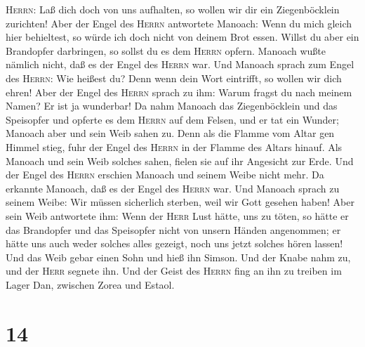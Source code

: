 \textsc{Herrn}: Laß dich doch von uns aufhalten, so wollen wir dir ein
Ziegenböcklein zurichten!  Aber der Engel des
\textsc{Herrn} antwortete Manoach: Wenn du mich gleich hier behieltest,
so würde ich doch nicht von deinem Brot essen. Willst du aber ein
Brandopfer darbringen, so sollst du es dem \textsc{Herrn} opfern.
Manoach wußte nämlich nicht, daß es der Engel des \textsc{Herrn} war.
 Und Manoach sprach zum Engel des \textsc{Herrn}: Wie
heißest du? Denn wenn dein Wort eintrifft, so wollen wir dich ehren!
 Aber der Engel des \textsc{Herrn} sprach zu ihm: Warum
fragst du nach meinem Namen? Er ist ja wunderbar!  Da
nahm Manoach das Ziegenböcklein und das Speisopfer und opferte es dem
\textsc{Herrn} auf dem Felsen, und er tat ein Wunder; Manoach aber und
sein Weib sahen zu.  Denn als die Flamme vom Altar gen
Himmel stieg, fuhr der Engel des \textsc{Herrn} in der Flamme des Altars
hinauf. Als Manoach und sein Weib solches sahen, fielen sie auf ihr
Angesicht zur Erde.  Und der Engel des \textsc{Herrn}
erschien Manoach und seinem Weibe nicht mehr. Da erkannte Manoach, daß
es der Engel des \textsc{Herrn} war.  Und Manoach sprach
zu seinem Weibe: Wir müssen sicherlich sterben, weil wir Gott gesehen
haben!  Aber sein Weib antwortete ihm: Wenn der
\textsc{Herr} Lust hätte, uns zu töten, so hätte er das Brandopfer und
das Speisopfer nicht von unsern Händen angenommen; er hätte uns auch
weder solches alles gezeigt, noch uns jetzt solches hören lassen!
 Und das Weib gebar einen Sohn und hieß ihn Simson. Und
der Knabe nahm zu, und der \textsc{Herr} segnete ihn. 
Und der Geist des \textsc{Herrn} fing an ihn zu treiben im Lager Dan,
zwischen Zorea und Estaol.

\hypertarget{section-13}{%
\section{14}\label{section-13}}

